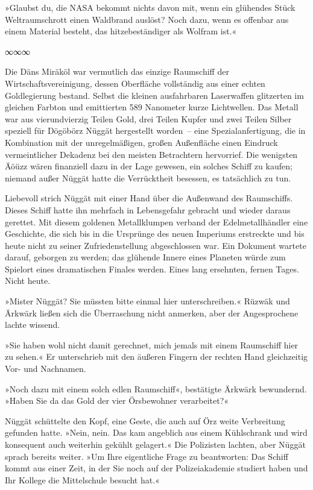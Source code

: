 »Glaubst du, die NASA bekommt nichts davon mit, wenn ein glühendes Stück Weltraumschrott einen Waldbrand auslöst? Noch dazu, wenn es offenbar aus einem Material besteht, das hitzebeständiger als Wolfram ist.«

\begin{center}
∞∞∞
\end{center}

Die Däns Miräköl war vermutlich das einzige Raumschiff der Wirtschaftsvereinigung, dessen Oberfläche vollständig aus einer echten Goldlegierung bestand. Selbst die kleinen ausfahrbaren Laserwaffen glitzerten im gleichen Farbton und emittierten 589 Nanometer kurze Lichtwellen. Das Metall war aus vierundvierzig Teilen Gold, drei Teilen Kupfer und zwei Teilen Silber speziell für Dögöbörz Nüggät hergestellt worden~– eine Spezialanfertigung, die in Kombination mit der unregelmäßigen, großen Außenfläche einen Eindruck vermeintlicher Dekadenz bei den meisten Betrachtern hervorrief. Die wenigsten Äöüzz wären finanziell dazu in der Lage gewesen, ein solches Schiff zu kaufen; niemand außer Nüggät hatte die Verrücktheit besessen, es tatsächlich zu tun.

Liebevoll strich Nüggät mit einer Hand über die Außenwand des Raumschiffs. Dieses Schiff hatte ihn mehrfach in Lebensgefahr gebracht und wieder daraus gerettet. Mit diesem goldenen Metallklumpen verband der Edelmetallhändler eine Geschichte, die sich bis in die Ursprünge des neuen Imperiums erstreckte und bis heute nicht zu seiner Zufriedenstellung abgeschlossen war. Ein Dokument wartete darauf, geborgen zu werden; das glühende Innere eines Planeten würde zum Spielort eines dramatischen Finales werden. Eines lang ersehnten, fernen Tages. Nicht heute.

»Mister Nüggät? Sie müssten bitte einmal hier unterschreiben.« Rüzwäk und Ärkwärk ließen sich die Überraschung nicht anmerken, aber der Angesprochene lachte wissend.

»Sie haben wohl nicht damit gerechnet, mich jemals mit einem Raumschiff hier zu sehen.« Er unterschrieb mit den äußeren Fingern der rechten Hand gleichzeitig Vor- und Nachnamen.

»Noch dazu mit einem solch edlen Raumschiff«, bestätigte Ärkwärk bewundernd. »Haben Sie da das Gold der vier Örsbewohner verarbeitet?«

Nüggät schüttelte den Kopf, eine Geste, die auch auf Örz weite Verbreitung gefunden hatte. »Nein, nein. Das kam angeblich aus einem Kühlschrank und wird konsequent auch weiterhin gekühlt gelagert.« Die Polizisten lachten, aber Nüggät sprach bereits weiter. »Um Ihre eigentliche Frage zu beantworten: Das Schiff kommt aus einer Zeit, in der Sie noch auf der Polizeiakademie studiert haben und Ihr Kollege die Mittelschule besucht hat.«

